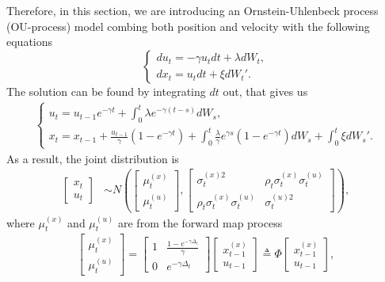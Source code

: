 Therefore, in this section, we are introducing an Ornstein-Uhlenbeck process (OU-process) model combing both position and velocity with the following equations  
\begin{equation}\label{OUprocess}
\begin{cases}
du_t = -\gamma u_t dt+ \lambda dW_t,\\
dx_t = u_t dt+\xi dW_t'.
\end{cases}
\end{equation}
The solution can be found by integrating $dt$ out, that gives us 
\begin{align}
\begin{cases}
u_t =u_{t-1}e^{-\gamma t} +\int_{0}^{t} \lambda e^{-\gamma (t-s)}dW_s,\\
x_t =x_{t-1} +\frac{u_{t-1}}{\gamma}\left(1- e^{-\gamma t}\right) + \int_{0}^{t} \frac{\lambda}{\gamma}e^{\gamma  s} \left(1-e^{-\gamma t}\right)dW_s + \int_{0}^{t}\xi dW_s'.
\end{cases}
\end{align}
As a result, the joint distribution is 
\begin{align}
\begin{bmatrix} x_t \\ u_t \end{bmatrix} &\sim N\left(
\begin{bmatrix}\mu_t^{(x)} \\ \mu_t^{(u)}  \end{bmatrix} , 
\begin{bmatrix}
\sigma_t^{(x)2} & \rho_t\sigma_t^{(x)} \sigma_t^{(u)} \\
\rho_t\sigma_t^{(x)} \sigma_t^{(u)} & \sigma_t^{(u)2}
\end{bmatrix} \right),
\end{align}
where $\mu_t^{(x)}$ and $\mu_t^{(u)} $ are from the forward map process 
\begin{align}
\begin{bmatrix}\mu_t^{(x)} \\ \mu_t^{(u)}  \end{bmatrix}  = 
\begin{bmatrix}
1 & \frac{1-e^{-\gamma \Delta_t}}{\gamma} \\ 0 &  e^{-\gamma \Delta_t}
\end{bmatrix}  \begin{bmatrix} x_{t-1}^{(x)} \\ u_{t-1}  \end{bmatrix} \triangleq \Phi \begin{bmatrix} x_{t-1}^{(x)} \\ u_{t-1}  \end{bmatrix},
\end{align}
